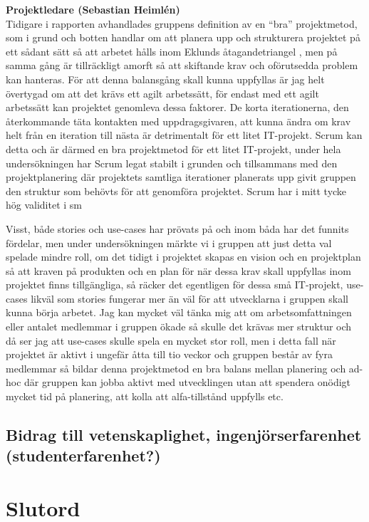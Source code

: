 \documentclass[conference,a4paper]{IEEEtran}
\begin{document}
\noindent \textbf{Projektledare (Sebastian Heimlén)}\\
Tidigare i rapporten avhandlades gruppens definition av en ``bra'' projektmetod, som i grund och botten handlar om att planera upp och strukturera projektet på ett sådant sätt så att arbetet hålls inom Eklunds åtagandetriangel \cite[s. 128-129]{Eklund14}, men på samma gång är tillräckligt amorft så att skiftande krav och oförutsedda problem kan hanteras. För att denna balansgång skall kunna uppfyllas är jag helt övertygad om att det krävs ett agilt arbetssätt, för endast med ett agilt arbetssätt kan projektet genomleva dessa faktorer. De korta iterationerna, den återkommande täta kontakten med uppdragsgivaren, att kunna ändra om krav helt från en iteration till nästa är detrimentalt för ett litet IT-projekt. Scrum kan detta och är därmed en bra projektmetod för ett litet IT-projekt, under hela undersökningen har Scrum legat stabilt i grunden och tillsammans med den projektplanering där projektets samtliga iterationer planerats upp givit gruppen den struktur som behövts för att genomföra projektet. Scrum har i mitt tycke hög validitet i sm

Visst, både stories och use-cases har prövats på och inom båda har det funnits fördelar, men under undersökningen märkte vi i gruppen att just detta val spelade mindre roll, om det tidigt i projektet skapas en vision och en projektplan så att kraven på produkten och en plan för när dessa krav skall uppfyllas inom projektet finns tillgängliga, så räcker det egentligen för dessa små IT-projekt, use-cases likväl som stories fungerar mer än väl för att utvecklarna i gruppen skall kunna börja arbetet. Jag kan mycket väl tänka mig att om arbetsomfattningen eller antalet medlemmar i gruppen ökade så skulle det krävas mer struktur och då ser jag att use-cases skulle spela en mycket stor roll, men i detta fall när projektet är aktivt i ungefär åtta till tio veckor och gruppen består av fyra medlemmar så bildar denna projektmetod en bra balans mellan planering och ad-hoc där gruppen kan jobba aktivt med utvecklingen utan att spendera onödigt mycket tid på planering, att kolla att alfa-tillstånd uppfylls etc.

\subsection{Bidrag till vetenskaplighet, ingenjörserfarenhet (studenterfarenhet?)}

\section{Slutord} \label{sec:slutord}
\end{document}
